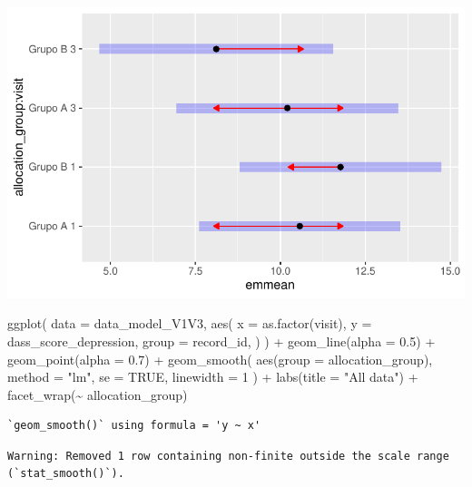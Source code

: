 \documentclass[
  letterpaper,
  DIV=11,
  numbers=noendperiod]{scrartcl}
\newenvironment{Shaded}{\begin{snugshade}}{\end{snugshade}}
\newcommand{\AttributeTok}[1]{\textcolor[rgb]{0.40,0.45,0.13}{#1}}
\newcommand{\ConstantTok}[1]{\textcolor[rgb]{0.56,0.35,0.01}{#1}}
\newcommand{\DecValTok}[1]{\textcolor[rgb]{0.68,0.00,0.00}{#1}}
\newcommand{\FloatTok}[1]{\textcolor[rgb]{0.68,0.00,0.00}{#1}}
\newcommand{\FunctionTok}[1]{\textcolor[rgb]{0.28,0.35,0.67}{#1}}
\newcommand{\NormalTok}[1]{\textcolor[rgb]{0.00,0.23,0.31}{#1}}
\newcommand{\SpecialCharTok}[1]{\textcolor[rgb]{0.37,0.37,0.37}{#1}}
\newcommand{\StringTok}[1]{\textcolor[rgb]{0.13,0.47,0.30}{#1}}
\begin{document}
\includegraphics{Outcomes_V1V2V3_files/figure-pdf/dass_score_depression_sens_emm-1.pdf}

\begin{Shaded}
\begin{Highlighting}[]
\FunctionTok{ggplot}\NormalTok{(}
    \AttributeTok{data =}\NormalTok{ data\_model\_V1V3, }
    \FunctionTok{aes}\NormalTok{(}
        \AttributeTok{x =} \FunctionTok{as.factor}\NormalTok{(visit),}
        \AttributeTok{y =}\NormalTok{ dass\_score\_depression,}
        \AttributeTok{group =}\NormalTok{ record\_id,}
\NormalTok{    )}
\NormalTok{) }\SpecialCharTok{+}
    \FunctionTok{geom\_line}\NormalTok{(}\AttributeTok{alpha =} \FloatTok{0.5}\NormalTok{) }\SpecialCharTok{+}
    \FunctionTok{geom\_point}\NormalTok{(}\AttributeTok{alpha =} \FloatTok{0.7}\NormalTok{) }\SpecialCharTok{+}
    \FunctionTok{geom\_smooth}\NormalTok{(}
        \FunctionTok{aes}\NormalTok{(}\AttributeTok{group =}\NormalTok{ allocation\_group),}
        \AttributeTok{method =} \StringTok{"lm"}\NormalTok{,}
        \AttributeTok{se =} \ConstantTok{TRUE}\NormalTok{,}
        \AttributeTok{linewidth =} \DecValTok{1}
\NormalTok{    ) }\SpecialCharTok{+}
    \FunctionTok{labs}\NormalTok{(}\AttributeTok{title =} \StringTok{"All data"}\NormalTok{) }\SpecialCharTok{+}
    \FunctionTok{facet\_wrap}\NormalTok{(}\SpecialCharTok{\textasciitilde{}}\NormalTok{ allocation\_group)}
\end{Highlighting}
\end{Shaded}

\begin{verbatim}
`geom_smooth()` using formula = 'y ~ x'
\end{verbatim}

\begin{verbatim}
Warning: Removed 1 row containing non-finite outside the scale range
(`stat_smooth()`).
\end{verbatim}
\end{document}
